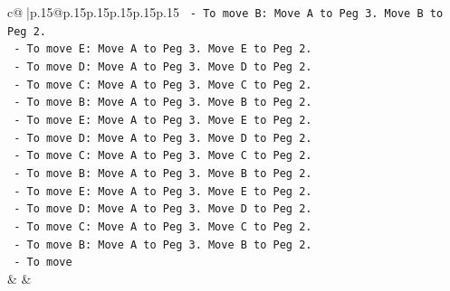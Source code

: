 \documentclass{article}
\begin{document}
{\begin{supertabular}{c@{$\;$}|p{.15\linewidth}@{}p{.15\linewidth}p{.15\linewidth}p{.15\linewidth}p{.15\linewidth}p{.15\linewidth}}
{{{\texttt{        {-}   To move B: Move A to Peg 3. Move B to Peg 2.} \\
\texttt{        {-}   To move E: Move A to Peg 3. Move E to Peg 2.} \\
\texttt{        {-}   To move D: Move A to Peg 3. Move D to Peg 2.} \\
\texttt{        {-}   To move C: Move A to Peg 3. Move C to Peg 2.} \\
\texttt{        {-}   To move B: Move A to Peg 3. Move B to Peg 2.} \\
\texttt{        {-}   To move E: Move A to Peg 3. Move E to Peg 2.} \\
\texttt{        {-}   To move D: Move A to Peg 3. Move D to Peg 2.} \\
\texttt{        {-}   To move C: Move A to Peg 3. Move C to Peg 2.} \\
\texttt{        {-}   To move B: Move A to Peg 3. Move B to Peg 2.} \\
\texttt{        {-}   To move E: Move A to Peg 3. Move E to Peg 2.} \\
\texttt{        {-}   To move D: Move A to Peg 3. Move D to Peg 2.} \\
\texttt{        {-}   To move C: Move A to Peg 3. Move C to Peg 2.} \\
\texttt{        {-}   To move B: Move A to Peg 3. Move B to Peg 2.} \\
\texttt{        {-}   To move} \\
            }
        }
    }
    & & \\ \\


\end{supertabular}}
\end{document}
